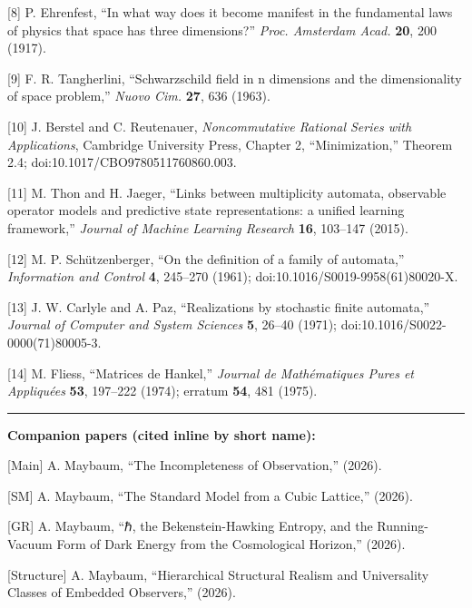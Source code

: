 \documentclass[
]{article}
\begin{document}
{[}8{]} P. Ehrenfest, ``In what way does it become manifest in the
fundamental laws of physics that space has three dimensions?''
\emph{Proc. Amsterdam Acad.} \textbf{20}, 200 (1917).

{[}9{]} F. R. Tangherlini, ``Schwarzschild field in n dimensions and the
dimensionality of space problem,'' \emph{Nuovo Cim.} \textbf{27}, 636
(1963).

{[}10{]} J. Berstel and C. Reutenauer, \emph{Noncommutative Rational
Series with Applications}, Cambridge University Press, Chapter 2,
``Minimization,'' Theorem 2.4; doi:10.1017/CBO9780511760860.003.

{[}11{]} M. Thon and H. Jaeger, ``Links between multiplicity automata,
observable operator models and predictive state representations: a
unified learning framework,'' \emph{Journal of Machine Learning
Research} \textbf{16}, 103--147 (2015).

{[}12{]} M. P. Schützenberger, ``On the definition of a family of
automata,'' \emph{Information and Control} \textbf{4}, 245--270 (1961);
doi:10.1016/S0019-9958(61)80020-X.

{[}13{]} J. W. Carlyle and A. Paz, ``Realizations by stochastic finite
automata,'' \emph{Journal of Computer and System Sciences} \textbf{5},
26--40 (1971); doi:10.1016/S0022-0000(71)80005-3.

{[}14{]} M. Fliess, ``Matrices de Hankel,'' \emph{Journal de
Mathématiques Pures et Appliquées} \textbf{53}, 197--222 (1974); erratum
\textbf{54}, 481 (1975).

\begin{center}\rule{0.5\linewidth}{0.5pt}\end{center}

\textbf{Companion papers (cited inline by short name):}

{[}Main{]} A. Maybaum, ``The Incompleteness of Observation,'' (2026).

{[}SM{]} A. Maybaum, ``The Standard Model from a Cubic Lattice,''
(2026).

{[}GR{]} A. Maybaum, ``ℏ, the Bekenstein-Hawking Entropy, and the
Running-Vacuum Form of Dark Energy from the Cosmological Horizon,''
(2026).

{[}Structure{]} A. Maybaum, ``Hierarchical Structural Realism and
Universality Classes of Embedded Observers,'' (2026).
\end{document}
